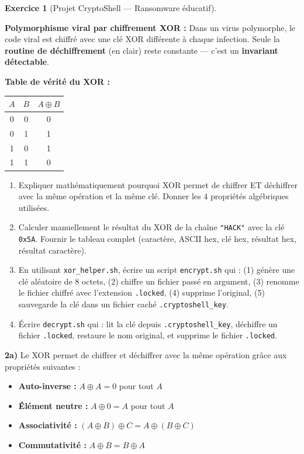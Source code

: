 \documentclass[a4paper,11pt]{article}
\theoremstyle{plain}
\theoremstyle{definition}
\newtheorem{exercice}{Exercice}
\begin{document}
\begin{exercice}[Projet CryptoShell --- Ransomware éducatif]
\begin{rappel}
\medskip
\textbf{Polymorphisme viral par chiffrement XOR :} Dans un virus polymorphe, le code viral est chiffré avec une clé XOR différente à chaque infection. Seule la \textbf{routine de déchiffrement} (en clair) reste constante --- c'est un \textbf{invariant détectable}.

\medskip
\textbf{Table de vérité du XOR :}
\begin{center}
\begin{tabular}{cc|c}
$A$ & $B$ & $A \oplus B$ \\
\midrule
0 & 0 & 0 \\
0 & 1 & 1 \\
1 & 0 & 1 \\
1 & 1 & 0 \\
\end{tabular}
\end{center}
\end{rappel}

\begin{enumerate}
\item[\textbf{2a)}] Expliquer mathématiquement pourquoi XOR permet de chiffrer ET déchiffrer avec la même opération et la même clé. Donner les 4 propriétés algébriques utilisées.

\item[\textbf{2b)}] Calculer manuellement le résultat du XOR de la chaîne \texttt{"HACK"} avec la clé \texttt{0x5A}. Fournir le tableau complet (caractère, ASCII hex, clé hex, résultat hex, résultat caractère).

\item[\textbf{2c)}] En utilisant \texttt{xor\_helper.sh}, écrire un script \texttt{encrypt.sh} qui : (1) génère une clé aléatoire de 8 octets, (2) chiffre un fichier passé en argument, (3) renomme le fichier chiffré avec l'extension \texttt{.locked}, (4) supprime l'original, (5) sauvegarde la clé dans un fichier caché \texttt{.cryptoshell\_key}.

\item[\textbf{2d)}] Écrire \texttt{decrypt.sh} qui : lit la clé depuis \texttt{.cryptoshell\_key}, déchiffre un fichier \texttt{.locked}, restaure le nom original, et supprime le fichier \texttt{.locked}.
\end{enumerate}

\begin{correction}

\textbf{2a)} Le XOR permet de chiffrer et déchiffrer avec la même opération grâce aux propriétés suivantes :
\begin{itemize}
    \item \textbf{Auto-inverse :} $A \oplus A = 0$ pour tout $A$
    \item \textbf{Élément neutre :} $A \oplus 0 = A$ pour tout $A$
    \item \textbf{Associativité :} $(A \oplus B) \oplus C = A \oplus (B \oplus C)$
    \item \textbf{Commutativité :} $A \oplus B = B \oplus A$
\end{itemize}


\end{correction}
\end{exercice}
\end{document}
